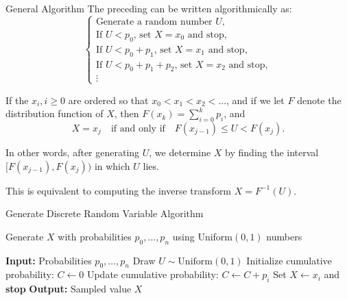 \documentclass[8pt]{beamer}
\begin{document}
\begin{frame}{General Algorithm}
The preceding can be written algorithmically as:
\begin{equation*}
	\begin{cases}
		\text{Generate a random number $U$},\\
		\text{If $U < p_0$, set $X = x_0$ and stop},\\
		\text{If $U < p_0 + p_1$, set $X = x_1$ and stop},\\
		\text{If $U < p_0 + p_1 + p_2$, set $X = x_2$ and stop},\\
		\vdots
	\end{cases}
\end{equation*}

\vspace{2mm}

If the $x_i, i \geq 0$ are ordered so that $x_0 < x_1 < x_2 < \dots$, and if we let $F$ denote the distribution function of $X$, then $F(x_k) = \sum_{i=0}^{k} p_i$, and
\begin{equation*}
	X = x_j \quad \text{if and only if} \quad F(x_{j-1}) \leq U < F(x_j).
\end{equation*}

\vspace{2mm}

In other words, after generating $U$, we determine $X$ by finding the interval $[F(x_{j-1}), F(x_j))$ in which $U$ lies.

\vspace{1mm}
This is equivalent to computing the inverse transform $X = F^{-1}(U)$.

\end{frame}

\begin{frame}{Generate Discrete Random Variable Algorithm}
\begin{algorithm}[H]
    \caption{Generate $X$ with probabilities $p_0, \dots, p_n$ using Uniform$(0,1)$ numbers}\label{alg:discrete-inverse}
    \begin{algorithmic}[1]
        \small  %
        \State \textbf{Input:} Probabilities $p_0, \dots, p_n$
        \State Draw $U \sim \text{Uniform}(0,1)$
        \State Initialize cumulative probability: $C \gets 0$
         
            \State Update cumulative probability: $C \gets C + p_i$
                \State Set $X \gets x_i$ and \textbf{stop}
            \EndIf
        \EndFor
        \State \textbf{Output:} Sampled value $X$
    \end{algorithmic}
\end{algorithm}
\end{frame}
\end{document}
